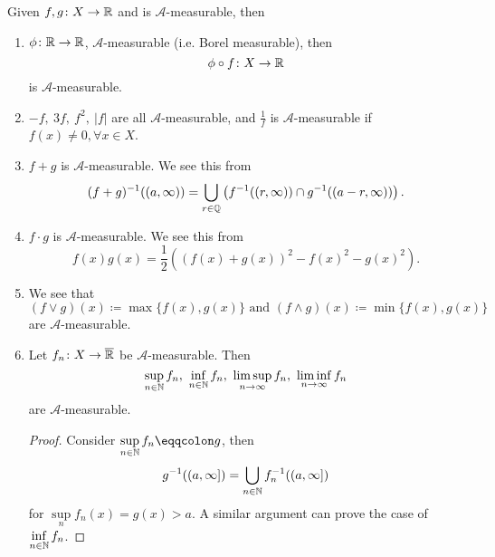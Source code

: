 \begin{property}
	Given \(f, g\colon X\to \mathbb{\MakeUppercase{r}} \) and is \(\mathcal{A}\)-measurable, then
	\begin{enumerate}
		\item \(\phi \colon \mathbb{\MakeUppercase{r}} \to \mathbb{\MakeUppercase{r}} \), \(\mathcal{A}\)-measurable (i.e. Borel measurable), then
		      \[
			      \phi \circ f\colon X\to \mathbb{\MakeUppercase{r}}
		      \]
		      is \(\mathcal{A}\)-measurable.
		\item \(-f,\ 3f,\ f^2,\ \left\vert f \right\vert \) are all \(\mathcal{A} \)-measurable, and \(\frac{1}{f}\) is \(\mathcal{A}\)-measurable if \(f(x)\neq 0, \forall x\in X\).
		\item \(f+g\) is \(\mathcal{A}\)-measurable. We see this from
		      \[
			      (f+g)^{-1} ((a, \infty ))=\bigcup\limits_{r\in\mathbb{\MakeUppercase{q}}} \left(f^{-1} ((r, \infty ))\cap g^{-1} ((a-r, \infty ))\right).
		      \]
		\item \(f\cdot g\) is \(\mathcal{A}\)-measurable. We see this from
		      \[
			      f(x)g(x) = \frac{1}{2}\left((f(x)+g(x))^2 - f(x)^2 - g(x)^2\right).
		      \]
		\item We see that
		      \[
			      (f\vee g)(x)\coloneqq \max \{f(x), g(x)\}\text{ and }(f\wedge g)(x)\coloneqq \min\{f(x), g(x)\}
		      \]
		      are \(\mathcal{A}\)-measurable.
		\item Let \(f_{n}\colon X\to \overline{\mathbb{\MakeUppercase{r}} }\) be \(\mathcal{A}\)-measurable. Then
		      \[
			      \sup\limits_{n\in\mathbb{\MakeUppercase{n}} } f_{n},\ \inf\limits_{n\in\mathbb{\MakeUppercase{n}} } f_{n},\ \limsup\limits_{n\to \infty} f_{n},\ \liminf\limits_{n\to \infty} f_{n}
		      \]
		      are \(\mathcal{A}\)-measurable.
		      \begin{proof}
			      Consider \(\sup\limits_{n\in\mathbb{\MakeUppercase{n}} } f_{n} \eqqcolon g\), then
			      \[
				      g^{-1} ((a, \infty ]) = \bigcup\limits_{n\in\mathbb{\MakeUppercase{n}}} f_{n}^{-1} ((a, \infty ])
			      \]
			      for \(\sup\limits_n f_{n}(x) = g(x)>a\). A similar argument can prove the case of \(\inf\limits_{n\in\mathbb{\MakeUppercase{n}} } f_{n}\).


\end{proof}
\end{enumerate}
\end{property}
